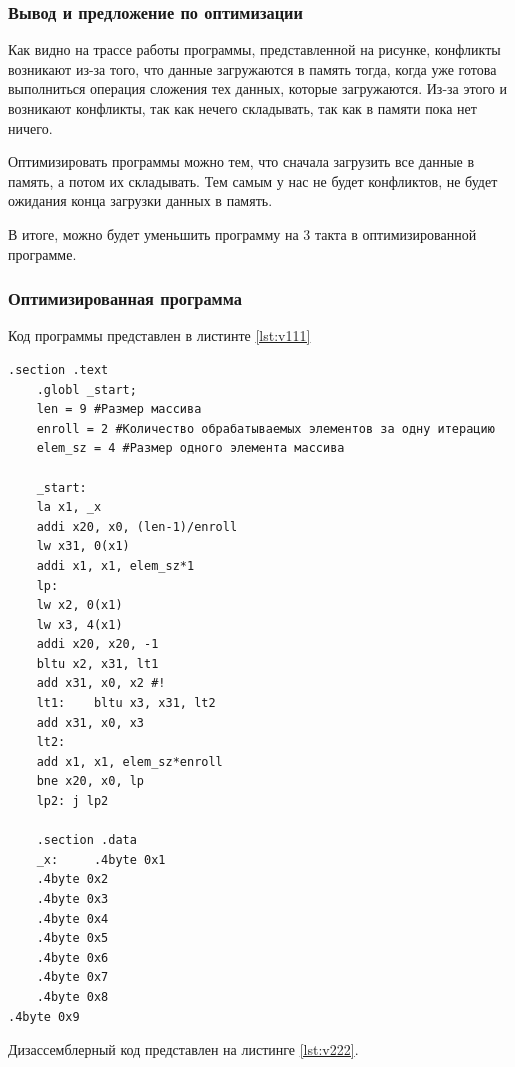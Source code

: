 \subsubsection*{Вывод и предложение по оптимизации}
Как видно на трассе работы программы, представленной на рисунке, конфликты возникают из-за того, что данные загружаются в память тогда, когда уже готова выполниться операция сложения тех данных, которые загружаются. Из-за этого и возникают конфликты, так как нечего складывать, так как в памяти пока нет ничего. 

Оптимизировать программы можно тем, что сначала загрузить все данные в память, а потом их складывать. Тем самым у нас не будет конфликтов, не будет ожидания конца загрузки данных в память.

В итоге, можно будет уменьшить программу на 3 такта в оптимизированной программе.

\clearpage

\subsubsection*{Оптимизированная программа}

Код программы представлен в листинте \ref{lst:v111}

\begin{lstlisting}[label=lst:v111,caption=Код программы (оптимизированный)]
	.section .text
	.globl _start;
	len = 9 #Размер массива
	enroll = 2 #Количество обрабатываемых элементов за одну итерацию
	elem_sz = 4 #Размер одного элемента массива
	
	_start:
	la x1, _x
	addi x20, x0, (len-1)/enroll
	lw x31, 0(x1)
	addi x1, x1, elem_sz*1
	lp:
	lw x2, 0(x1)
	lw x3, 4(x1)
	addi x20, x20, -1
	bltu x2, x31, lt1
	add x31, x0, x2 #!
	lt1:    bltu x3, x31, lt2
	add x31, x0, x3
	lt2:
	add x1, x1, elem_sz*enroll
	bne x20, x0, lp
	lp2: j lp2
	
	.section .data
	_x:     .4byte 0x1
	.4byte 0x2
	.4byte 0x3
	.4byte 0x4
	.4byte 0x5
	.4byte 0x6
	.4byte 0x7
	.4byte 0x8
.4byte 0x9
\end{lstlisting}

\clearpage

Дизассемблерный код представлен на листинге \ref{lst:v222}.

